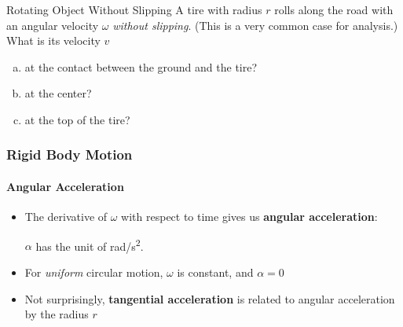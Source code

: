 \documentclass[12pt,compress,aspectratio=169]{beamer}
\newcommand{\eq}[2]{\vspace{#1}{\Large\begin{displaymath}#2\end{displaymath}}}
\begin{document}
\begin{frame}{Rotating Object Without Slipping}
  A tire with radius $r$ rolls along the road with an angular velocity $\omega$
  \emph{without slipping}. (This is a very common case for analysis.)  What
  is its velocity $v$
  \begin{enumerate}[a.]
  \item at the contact between the ground and the tire?
  \item at the center?
  \item at the top of the tire?
  \end{enumerate}

  \vspace{-.4in}
  \begin{center}
    \hspace{1in}
  \end{center}
\end{frame}

\begin{frame}
  \frametitle{Rigid Body Motion}
  \framesubtitle{Angular Acceleration}
  \begin{itemize}
  \item The derivative of $\omega$ with respect to time gives us
    \textbf{angular acceleration}:

    \eq{-.2in}{
      \boxed{\alpha=\frac{d\omega(t)}{dt}=\frac{d^2\theta(t)}{dt^2}}
    }

    \vspace{-.1in}$\alpha$ has the unit of \si{rad/\second^2}.

  \item For \emph{uniform} circular motion, $\omega$ is constant, and $\alpha=0$
  \item Not surprisingly, \textbf{tangential acceleration} is related to
    angular acceleration by the radius $r$
    
    \eq{-.2in}{
      \boxed{a_\theta=\frac{dv}{dt}=r\frac{d\omega(t)}{dt}=r\alpha}
    }

  \end{itemize}
\end{frame}
\end{document}

